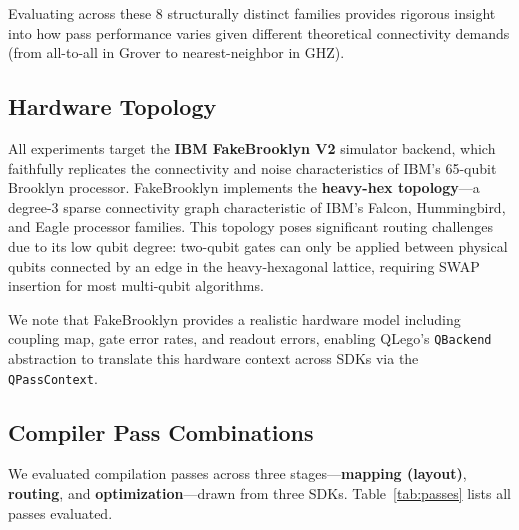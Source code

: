 \documentclass[conference]{IEEEtran}
\begin{document}
Evaluating across these 8 structurally distinct families provides rigorous insight into how pass performance varies given different theoretical connectivity demands (from all-to-all in Grover to nearest-neighbor in GHZ).

\subsection{Hardware Topology}
\label{subsec:topologies}

All experiments target the \textbf{IBM FakeBrooklyn V2} simulator backend, which faithfully replicates the connectivity and noise characteristics of IBM's 65-qubit Brooklyn processor. FakeBrooklyn implements the \textbf{heavy-hex topology}---a degree-3 sparse connectivity graph characteristic of IBM's Falcon, Hummingbird, and Eagle processor families. This topology poses significant routing challenges due to its low qubit degree: two-qubit gates can only be applied between physical qubits connected by an edge in the heavy-hexagonal lattice, requiring SWAP insertion for most multi-qubit algorithms.

We note that FakeBrooklyn provides a realistic hardware model including coupling map, gate error rates, and readout errors, enabling QLego's \texttt{QBackend} abstraction to translate this hardware context across SDKs via the \texttt{QPassContext}.

\subsection{Compiler Pass Combinations}
\label{subsec:combinations}

We evaluated compilation passes across three stages---\textbf{mapping (layout)}, \textbf{routing}, and \textbf{optimization}---drawn from three SDKs. Table~\ref{tab:passes} lists all passes evaluated.
\end{document}
